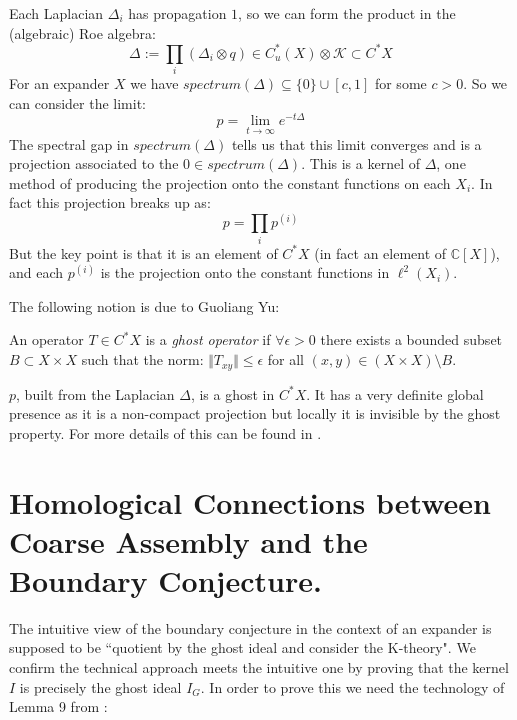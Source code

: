 \begin{conjecture}
{\begin{remark}\label{Rem:Ghost}
Each Laplacian $\Delta_{i}$ has propagation $1$, so we can form the product in the (algebraic) Roe algebra:
\begin{equation*}
\Delta:=\prod_{i}(\Delta_{i} \otimes q) \in C^{*}_{u}(X)\otimes \mathcal{K} \subset C^{*}X
\end{equation*}
For an expander $X$ we have $spectrum(\Delta) \subseteq \lbrace 0 \rbrace \cup [c,1]$ for some $c>0$. So we can consider the limit:
\begin{equation*}
p = \lim_{t \rightarrow \infty}e^{-t\Delta}
\end{equation*}
The spectral gap in $spectrum(\Delta)$ tells us that this limit converges and is a projection associated to the $0 \in spectrum(\Delta)$. This is a kernel of $\Delta$, one method of producing the projection onto the constant functions on each $X_{i}$. In fact this projection breaks up as:
\begin{equation*}
p=\prod_{i}p^{(i)}
\end{equation*}
But the key point is that it is an element of $C^{*}X$ (in fact an element of $\mathbb{C}[X]$), and each $p^{(i)}$ is the projection onto the constant functions in $\ell^{2}(X_{i})$. 

The following notion is due to Guoliang Yu:

\begin{definition}
An operator $T \in C^{*}X$ is a \textit{ghost operator} if $\forall \epsilon >0$ there exists a bounded subset $B \subset X\times X$ such that the norm: $\Vert T_{xy} \Vert \leq \epsilon$ for all $(x,y) \in (X\times X) \setminus B$.
\end{definition}

$p$, built from the Laplacian $\Delta$, is a ghost in $C^{*}X$. It has a very definite global presence as it is a non-compact projection but locally it is invisible by the ghost property. For more details of this can be found in \cite[Section 5]{explg1}.
\end{remark}

\section{Homological Connections between Coarse Assembly and the Boundary Conjecture.}

The intuitive view of the boundary conjecture in the context of an expander is supposed to be ``quotient by the ghost ideal and consider the K-theory". We confirm the technical approach meets the intuitive one by proving that the kernel $I$ is precisely the ghost ideal $I_{G}$. In order to prove this we need the technology of Lemma 9 from \cite{MR1911663}:

}
\end{conjecture}

